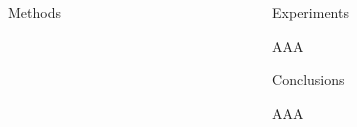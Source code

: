 \documentclass[final]{beamer}
\newlength{\sepwidth}
\newlength{\colwidth}
\newcommand{\separatorcolumn}{\begin{column}{\sepwidth}\end{column}}
\begin{document}
\begin{frame}[t]
\begin{columns}[t]
\begin{column}{\colwidth}
\begin{block}{Methods}
\begin{figure}[h]
\end{figure}


\end{block}


\end{column}

\separatorcolumn

\begin{column}{\colwidth}

\begin{block}{Experiments}


AAA

\end{block}




   \begin{exampleblock}{Conclusions}
  

AAA
  \end{exampleblock}



  





\end{column}

\separatorcolumn



\end{columns}
\end{frame}
\end{document}

